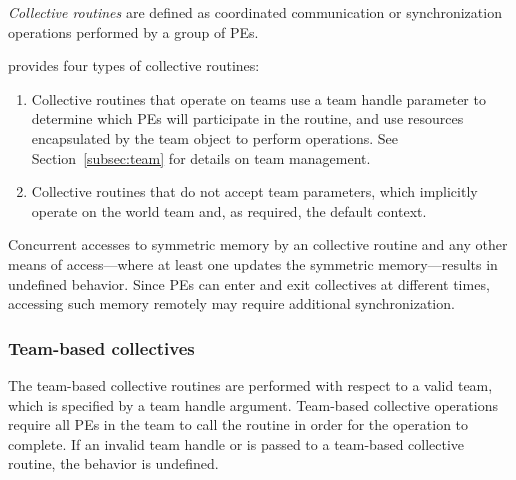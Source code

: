 \emph{Collective routines} are defined as coordinated communication or synchronization
operations performed by a group of \acp{PE}.

\openshmem provides four types of collective routines:

\begin{enumerate}
    \item Collective routines that operate on teams use a team handle parameter to determine
    which \acp{PE} will participate in the routine, and use resources encapsulated by the team object
    to perform operations. See Section~\ref{subsec:team} for details on team management.


    \item Collective routines that do not accept team
    parameters, which implicitly operate on the world team and, as
    required, the default context.
\end{enumerate}

Concurrent accesses to symmetric memory by an \openshmem collective
routine and any other means of access---where at least one updates the
symmetric memory---results in undefined behavior.
Since \acp{PE} can enter and exit collectives at different times,
accessing such memory remotely may require additional synchronization.

\subsubsection*{Team-based collectives}
\label{subsec:team_collectives}

The team-based collective routines are performed with respect to a valid
\openshmem team, which is specified by a team handle argument.
Team-based collective operations require all \acp{PE} in the team to call
the routine in order for the operation to complete. If an invalid team handle
or  is passed to a team-based collective
routine, the behavior is undefined.

